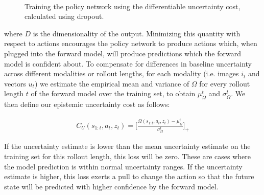 \documentclass{article} %
\begin{document}
\begin{figure}[t!]
    \centering
     \\
    \label{planning-methods}
    \caption{Training the policy network using the differentiable uncertainty cost, calculated using dropout.}
\end{figure}




where $D$ is the dimensionality of the output. Minimizing this quantity with respect to actions encourages the policy network to produce actions which, when plugged into the forward model, will produce predictions which the forward model is confident about.
    To compensate for differences in baseline uncertainty across different modalities or rollout lengths, for each modality (i.e. images $i_t$ and vectors $u_t$) we estimate the empirical mean and variance of $\Omega$ for every rollout length $t$ of the forward model over the training set, to obtain $\mu_{\Omega}^t$ and $\sigma_{\Omega}^t$. We then define our epistemic uncertainty cost as follows:

    \begin{align}
      C_U(s_{1:t}, a_t, z_t) = \Big [ \frac{\Omega(s_{1:t}, a_t, z_t) - \mu_\Omega^t}{\sigma_\Omega^t} \Big]_+
    \end{align}

    If the uncertainty estimate is lower than the mean uncertainty estimate on the training set for this rollout length, this loss will be zero.
    These are cases where the model prediction is within normal uncertainty ranges. If the uncertainty estimate is higher, this loss exerts a pull to change the action so that the future state will be predicted with higher confidence by the forward model.
\end{document}
